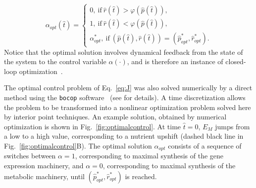 \begin{equation}
\label{eq:optcontrol}
\alpha_{opt}(\hat{t})=
\begin{cases}
0, \ \textrm{if} \ \hat{r}(\hat{t}) > \varphi(\hat{p}(\hat{t})),\\
1, \ \textrm{if} \ \hat{r}(\hat{t}) < \varphi(\hat{p}(\hat{t})), \\
\alpha^*_{opt}, \ \textrm{if} \ (\hat{p}(\hat{t}),\hat{r}(\hat{t}))=(\hat{p}_{opt}^*,\hat{r}_{opt}^*).
\end{cases}
\end{equation}
Notice that the optimal solution involves dynamical feedback from the state of the system to the control variable $\alpha(\cdot)$, and is therefore an instance of closed-loop optimization~\cite{stengel_optimal_1994}.

The optimal control problem of Eq.~\ref{eq:J} was also solved numerically by a direct method using the \texttt{bocop} software~\cite{bonnans_bocop_2012} (see  for details).
A time discretization allows the problem to be transformed into a nonlinear optimization problem solved here by interior point techniques.
An example solution, obtained by numerical optimization is shown in Fig.~\ref{fig:optimalcontrol}.
At time $\hat{t}=0$, $E_M$ jumps from a low to a high value, corresponding to a nutrient upshift (dashed black line in Fig.~\ref{fig:optimalcontrol}B).
The optimal solution $\alpha_{opt}$ consists of a sequence of switches between $\alpha=1$, corresponding to maximal synthesis of the gene expression machinery, and $\alpha=0$, corresponding to maximal synthesis of the metabolic machinery, until $(\hat{p}_{opt}^*,\hat{r}_{opt}^*)$ is reached.

